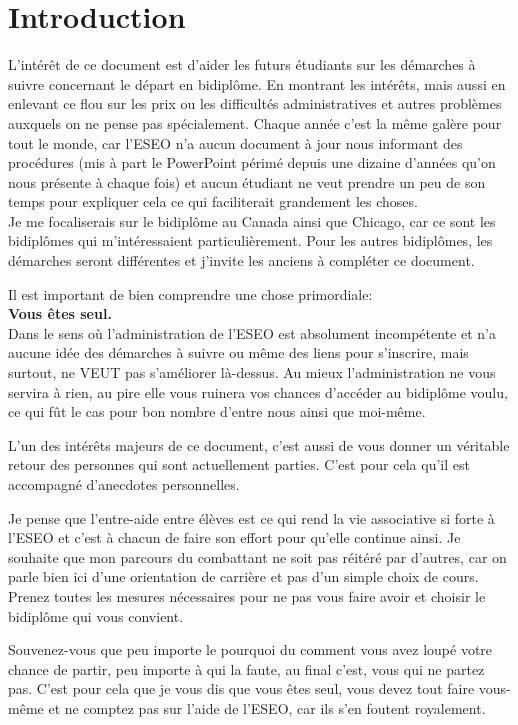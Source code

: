 \chapter{Introduction}\label{ch:Intro}

L'intérêt de ce document est d'aider les futurs étudiants sur les démarches à suivre concernant le départ en bidiplôme. En montrant les intérêts, mais aussi en enlevant ce flou sur les prix ou les difficultés administratives et autres problèmes auxquels on ne pense pas spécialement. Chaque année c'est la même galère pour tout le monde, car l'ESEO n'a aucun document à jour nous informant des procédures (mis à part le PowerPoint périmé depuis une dizaine d'années qu'on nous présente à chaque fois) et aucun étudiant ne veut prendre un peu de son temps pour expliquer cela ce qui faciliterait grandement les choses.\\
Je me focaliserais sur le bidiplôme au Canada ainsi que Chicago, car ce sont les bidiplômes qui m'intéressaient particulièrement. Pour les autres bidiplômes, les démarches seront différentes et j'invite les anciens à compléter ce document.

Il est important de bien comprendre une chose primordiale: \\
\textbf{Vous êtes seul.} \\
Dans le sens où l'administration de l'ESEO est absolument incompétente et n'a aucune idée des démarches à suivre ou même des liens pour s'inscrire, mais surtout, ne VEUT pas s'améliorer là-dessus. Au mieux l'administration ne vous servira à rien, au pire elle vous ruinera vos chances d'accéder au bidiplôme voulu, ce qui fût le cas pour bon nombre d'entre nous ainsi que moi-même.

L'un des intérêts majeurs de ce document, c'est aussi de vous donner un véritable retour des personnes qui sont actuellement parties. C'est pour cela qu'il est accompagné d'anecdotes personnelles.

Je pense que l'entre-aide entre élèves est ce qui rend la vie associative si forte à l'ESEO et c'est à chacun de faire son effort pour qu'elle continue ainsi. Je souhaite que mon parcours du combattant ne soit pas réitéré par d'autres, car on parle bien ici d'une orientation de carrière et pas d'un simple choix de cours. Prenez toutes les mesures nécessaires pour ne pas vous faire avoir et choisir le bidiplôme qui vous convient.

Souvenez-vous que peu importe le pourquoi du comment vous avez loupé votre chance de partir, peu importe à qui la faute, au final c'est, vous qui ne partez pas. C'est pour cela que je vous dis que vous êtes seul, vous devez tout faire vous-même et ne comptez pas sur l'aide de l'ESEO, car ils s'en foutent royalement.

